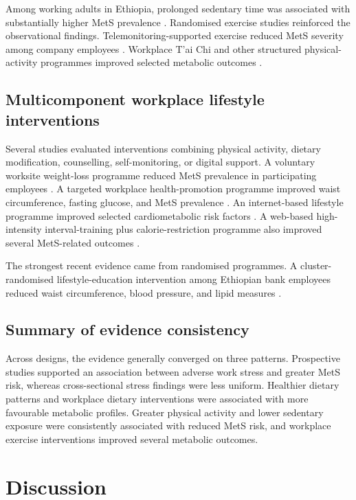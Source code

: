 \documentclass[11pt]{article}
\begin{document}
Among working adults in Ethiopia, prolonged sedentary time was associated with substantially higher MetS prevalence \citep{Motuma2020}. Randomised exercise studies reinforced the observational findings. Telemonitoring-supported exercise reduced MetS severity among company employees \citep{Haufe2019}. Workplace T'ai Chi and other structured physical-activity programmes improved selected metabolic outcomes \citep{Choi2017,Fang2019}.

\subsection{Multicomponent workplace lifestyle interventions}

Several studies evaluated interventions combining physical activity, dietary modification, counselling, self-monitoring, or digital support. A voluntary worksite weight-loss programme reduced MetS prevalence in participating employees \citep{Earnest2015}. A targeted workplace health-promotion programme improved waist circumference, fasting glucose, and MetS prevalence \citep{Ryu2017}. An internet-based lifestyle programme improved selected cardiometabolic risk factors \citep{Kim2015Internet}. A web-based high-intensity interval-training plus calorie-restriction programme also improved several MetS-related outcomes \citep{So2025}.

The strongest recent evidence came from randomised programmes. A cluster-randomised lifestyle-education intervention among Ethiopian bank employees reduced waist circumference, blood pressure, and lipid measures \citep{Bogale2025}.

\subsection{Summary of evidence consistency}

Across designs, the evidence generally converged on three patterns. Prospective studies supported an association between adverse work stress and greater MetS risk, whereas cross-sectional stress findings were less uniform. Healthier dietary patterns and workplace dietary interventions were associated with more favourable metabolic profiles. Greater physical activity and lower sedentary exposure were consistently associated with reduced MetS risk, and workplace exercise interventions improved several metabolic outcomes.



\section{Discussion}
\end{document}
